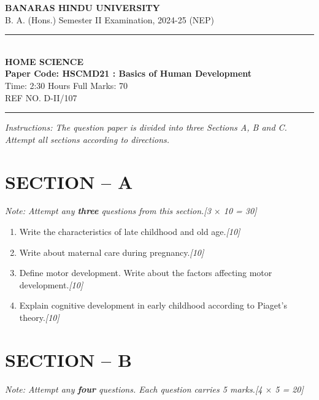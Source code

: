 \documentclass[11pt,a4paper]{article}
\newcommand{\pts}[1]{\hfill \textit{[#1]}}
\begin{document}
\begin{center}
  {\large\bfseries BANARAS HINDU UNIVERSITY}\\[2pt]
  {\normalsize B. A. (Hons.) Semester II Examination, 2024-25 (NEP)}\\[6pt]
  \rule{0.8\linewidth}{0.5pt}\\[6pt]
  {\large\bfseries HOME SCIENCE}\\[4pt]
  {\large\bfseries Paper Code: HSCMD21 : Basics of Human Development}\\[4pt]
  {\normalsize Time: 2:30 Hours \hfill Full Marks: 70}\\[2pt]
  {\small REF NO. D-II/107}
\end{center}
\rule{\linewidth}{0.4pt}
\smallskip

\noindent \textit{Instructions: The question paper is divided into three Sections A, B and C. Attempt all sections according to directions.}

\bigskip

\section*{SECTION -- A}
\noindent \textit{Note: Attempt any \textbf{three} questions from this section.}\pts{3 $\times$ 10 = 30}

\begin{enumerate}[label=\textbf{\arabic*.},leftmargin=*,itemsep=10pt]

  \item Write the characteristics of late childhood and old age.\pts{10}

  \item Write about maternal care during pregnancy.\pts{10}

  \item Define motor development. Write about the factors affecting motor development.\pts{10}

  \item Explain cognitive development in early childhood according to Piaget's theory.\pts{10}

\end{enumerate}

\bigskip

\section*{SECTION -- B}
\noindent \textit{Note: Attempt any \textbf{four} questions. Each question carries 5 marks.}\pts{4 $\times$ 5 = 20}
\end{document}
